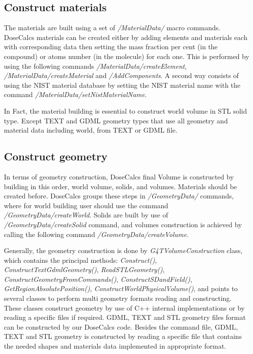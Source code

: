 \documentclass[letterpaper,12pt]{article}
\begin{document}
\subsection{Construct materials}

The materials are built using a set of \textit{/MaterialData/} macro commands. DoseCalcs materials can be created either by adding elements and materials each with corresponding data then setting the mass fraction per cent (in the compound) or atoms number (in the molecule) for each one. This is performed by using the following commands \textit{/MaterialData/createElement}, \textit{/MaterialData/createMaterial} and \textit{/AddComponents}. A second way consists of using the NIST \cite{NISTDataBase} material database by setting the NIST material name with the command \textit{/MaterialData/setNistMaterialName}.

In Fact, the material building is essential to construct world volume in STL solid type. Except TEXT and GDML geometry types that use all geometry and material data including world, from TEXT or GDML file.

\subsection{Construct geometry}

In terms of geometry construction, DoseCalcs final Volume is constructed by building in this order, world volume, solids, and volumes. Materials should be created before. DoseCalcs groups these steps in \textit{/GeometryData/} commands, where for world building user should use the command \textit{/GeometryData/createWorld}. Solids are built by use of \textit{/GeometryData/createSolid} command, and volumes construction is achieved by calling the following command \textit{/GeometryData/createVolume}.

Generally, the geometry construction is done by \textit{G4TVolumeConstruction} class, which contains the principal methods: \textit{Construct()}, \textit{ConstructTextGdmlGeometry()}, \textit{ReadSTLGeometry()}, \textit{ConstructGeometryFromCommands()}, \textit{ConstructSDandField()}, \textit{GetRegionAbsolutePosition()}, \textit{ConstructWorldPhysicalVolume()}, and points to several classes to perform multi geometry formats reading and constructing. These classes construct geometry by use of C++ internal implementations or by reading a specific files if required. GDML, TEXT and STL geometry files format can be constructed by our DoseCalcs code. Besides the command file, GDML, TEXT and STL geometry is constructed by reading a specific file that contains the needed shapes and materials data implemented in appropriate format.
\end{document}
